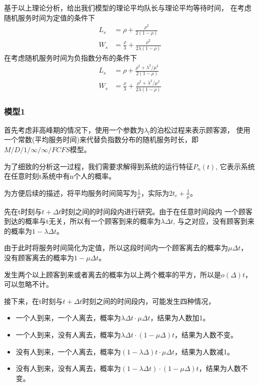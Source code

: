     基于以上理论分析，给出我们模型的理论平均队长与理论平均等待时间，
    在考虑随机服务时间为定值的条件下
    \begin{equation}
        \begin{aligned}
            L_s & =\rho +\frac{\rho^2 }{2(1-\rho)} \\
            W_s &=\frac{\rho}{\lambda} +\frac{\rho^2}{2\lambda (1-\rho)}
        \end{aligned}
    \end{equation}
    在考虑随机服务时间为负指数分布的条件下
    \begin{equation}
        \begin{aligned}
            L_s & =\rho +\frac{\rho^2 +\lambda^2 /\mu^2}{2(1-\rho)} \\
            W_s &=\frac{\rho}{\lambda} +\frac{\rho^2 +\lambda^2 /\mu^2}{2\lambda (1-\rho)}
        \end{aligned}
    \end{equation}

\subsubsection{模型1}
首先考虑非高峰期的情况下，使用一个参数为$\lambda_{l}$的泊松过程来表示顾客源，
使用一个常数(平均服务时间)来代替负指数分布的随机服务时长，即$M/D/1/\infty/\infty/FCFS$模型。

为了细致的分析这一过程，我们需要求解得到系统的运行特征$P_n(t)$,
它表示系统在任意时刻t系统中有n个人的概率。

为方便后续的描述，将平均服务时间简写为$\frac{1}{\mu}$，实际为$2t_c+\frac{1}{\mu}$。

先在t时刻与$t+\Delta t$时刻之间的时间段内进行研究。由于在任意时间段内
一个顾客到达的概率与t无关，所以有一个顾客到来的概率为$\lambda \Delta t$,
与之对应，没有顾客到来的概率为$1- \lambda \Delta t$。

由于此时将服务时间简化为定值，所以这段时间内一个顾客离去的概率为$\mu \Delta t$，
没有顾客离去的概率为$1-\mu \Delta t$。

发生两个以上顾客到来或者离去的概率为以上两个概率的平方，所以是$o(\Delta)t$，可以忽略不计。

接下来，在t时刻与$t+\Delta t$时刻之间的时间段内，可能发生四种情况，
\begin{itemize}
\item 一个人到来，一个人离去，概率为$\lambda \Delta t \cdot \mu \Delta t$，结果为人数加1。
\item 一个人到来，没有人离去，概率为$\lambda \Delta t \cdot (1-\mu \Delta) t$，结果为人数不变。
\item 没有人到来，一个人离去，概率为$(1-\lambda \Delta) t \cdot \mu \Delta t$，结果为人数减1。
\item 没有人到来，没有人离去，概率为$(1-\lambda \Delta t) \cdot (1-\mu \Delta) t$，结果为人数不变。
\end{itemize}


